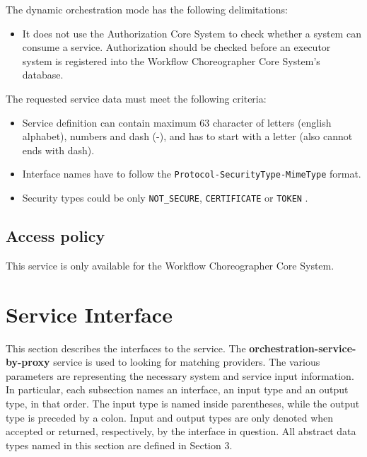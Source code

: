 \documentclass[a4paper]{arrowhead}
\begin{document}
The dynamic orchestration mode has the following delimitations:

\begin{itemize}
    \item It does not use the Authorization Core System to check whether a system can consume a service. Authorization should be checked before an executor system is registered into the Workflow Choreographer Core System's database.
\end{itemize}

The requested service data must meet the following criteria:

\begin{itemize}
    \item Service definition can contain maximum 63 character of letters (english alphabet), numbers and dash (-), and has to start with a letter (also cannot ends with dash).
    \item Interface names have to follow the \texttt{Protocol-SecurityType-MimeType} format.
    \item Security types could be only \texttt{NOT\_SECURE}, \texttt{CERTIFICATE} or \texttt{TOKEN} .
\end{itemize}

\subsection{Access policy}
\label{sec:accesspolicy}

This service is only available for the Workflow Choreographer Core System.  

\newpage

\section{Service Interface}
\label{sec:functions}

This section describes the interfaces to the service. The \textbf{orchestration-service-by-proxy} service is used to looking for matching providers. The various parameters are representing the necessary system and service input information.
In particular, each subsection names an interface, an input type and an output type, in that order.
The input type is named inside parentheses, while the output type is preceded by a colon.
Input and output types are only denoted when accepted or returned, respectively, by the interface in question. All abstract data types named in this section are defined in Section 3.
\end{document}
